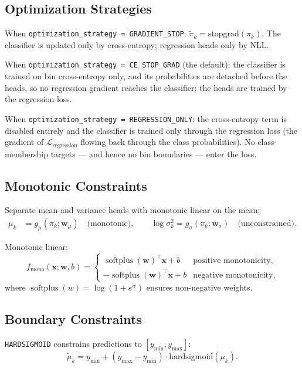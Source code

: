 \documentclass[11pt,a4paper]{article}
\theoremstyle{definition}
\newcommand{\bx}{\mathbf{x}}
\newcommand{\bw}{\mathbf{w}}
\DeclareMathOperator{\softplus}{softplus}
\begin{document}
\subsection{Optimization Strategies}

When \texttt{optimization\_strategy = GRADIENT\_STOP}:
$\tilde{\pi}_k = \mathrm{stopgrad}(\pi_k)$.
The classifier is updated only by cross-entropy; regression heads only by NLL.

When \texttt{optimization\_strategy = CE\_STOP\_GRAD} (the default): the classifier is trained on
bin cross-entropy only, and its probabilities are detached before the heads, so no regression
gradient reaches the classifier; the heads are trained by the regression loss.

When \texttt{optimization\_strategy = REGRESSION\_ONLY}: the cross-entropy term is disabled
entirely and the classifier is trained only through the regression loss (the gradient of
$\mathcal{L}_{\mathrm{regression}}$ flowing back through the class probabilities). No
class-membership targets --- and hence no bin boundaries --- enter the loss.

\subsection{Monotonic Constraints}

Separate mean and variance heads with monotonic linear on the mean:
\begin{align}
  \mu_k &= g_{\mu}(\pi_k; \bw_\mu) \quad \text{(monotonic)}, \qquad
  \log\sigma_k^2 = g_{\sigma}(\pi_k; \bw_\sigma) \quad \text{(unconstrained)}.
\end{align}

Monotonic linear:
\[
  f_{\text{mono}}(\bx; \bw, b) =
  \begin{cases}
    \softplus(\bw)^\top \bx + b & \text{positive monotonicity}, \\
    -\softplus(\bw)^\top \bx + b & \text{negative monotonicity},
  \end{cases}
\]
where $\softplus(w) = \log(1 + e^w)$ ensures non-negative weights.

\subsection{Boundary Constraints}

\texttt{HARDSIGMOID} constrains predictions to $[y_{\min}, y_{\max}]$:
\[
  \tilde{\mu}_k = y_{\min} + (y_{\max} - y_{\min}) \cdot \mathrm{hardsigmoid}(\mu_k).
\]
\end{document}
